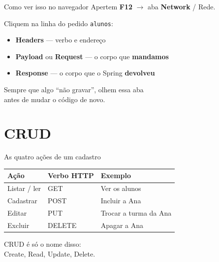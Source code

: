\documentclass[aspectratio=169,11pt]{beamer}
\begin{document}
\begin{frame}{Como ver isso no navegador}
  Apertem \textbf{F12} $\rightarrow$ aba \textbf{Network} / Rede.

  \vspace{0.5em}
  Cliquem na linha do pedido \texttt{alunos}:
  \begin{itemize}
    \item \textbf{Headers} --- verbo e endereço
    \item \textbf{Payload} ou \textbf{Request} --- o corpo que
          \textbf{mandamos}
    \item \textbf{Response} --- o corpo que o Spring \textbf{devolveu}
  \end{itemize}

  \vspace{0.6em}
  Sempre que algo ``não gravar'', olhem essa aba\\
  antes de mudar o código de novo.
\end{frame}

\section{CRUD}

\begin{frame}{As quatro ações de um cadastro}
  \begin{center}
  \begin{tabular}{lll}
    \toprule
    Ação & Verbo HTTP & Exemplo \\
    \midrule
    Listar / ler & GET & Ver os alunos \\
    Cadastrar & POST & Incluir a Ana \\
    Editar & PUT & Trocar a turma da Ana \\
    Excluir & DELETE & Apagar a Ana \\
    \bottomrule
  \end{tabular}
  \end{center}

  \vspace{0.7em}
  CRUD é só o nome disso:\\
  Create, Read, Update, Delete.
\end{frame}
\end{document}
